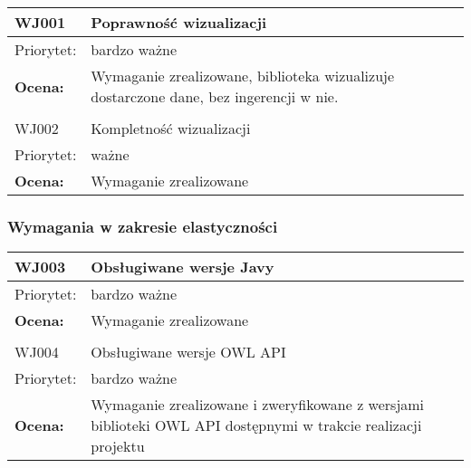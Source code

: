 \documentclass[a4paper,10pt]{article}
\begin{document}


\begin{center}

\begin{tabular}{|m{3cm}|m{9cm}|} \hline

WJ001 & Poprawność wizualizacji \\ \hline
Priorytet: & bardzo ważne \\ \hline
\textbf{Ocena:} & Wymaganie zrealizowane, biblioteka wizualizuje dostarczone dane, bez ingerencji w nie.\\ \hline
\multicolumn{2}{c}{} \\
 \hline

WJ002 & Kompletność wizualizacji \\ \hline
Priorytet: & ważne \\ \hline
\textbf{Ocena:} & Wymaganie zrealizowane \\ \hline
\end{tabular}

\end{center}

\subsubsection{Wymagania w zakresie elastyczności}


\begin{center}

\begin{tabular}{|m{3cm}|m{9cm}|} \hline

WJ003 & Obsługiwane wersje Javy \\ \hline
Priorytet: & bardzo ważne \\ \hline
\textbf{Ocena:} & Wymaganie zrealizowane \\ \hline
\multicolumn{2}{c}{} \\
 \hline

WJ004 & Obsługiwane wersje OWL API \\ \hline
Priorytet: & bardzo ważne \\ \hline
\textbf{Ocena:} & Wymaganie zrealizowane i zweryfikowane z wersjami biblioteki OWL API dostępnymi w trakcie realizacji projektu  \\ \hline
\end{tabular}

\end{center}
\end{document}
